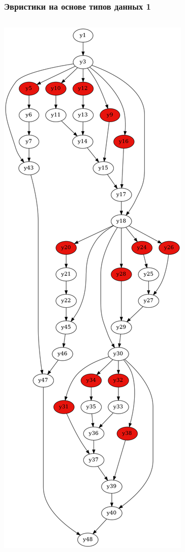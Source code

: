 \documentclass{beamer}
\begin{document}
\begin{frame}\frametitle{Эвристики на основе типов данных 1}
    \begin{columns}
    \includegraphics[width=\textwidth]{hash2if3.png}

\end{columns}
\end{frame}
\end{document}
